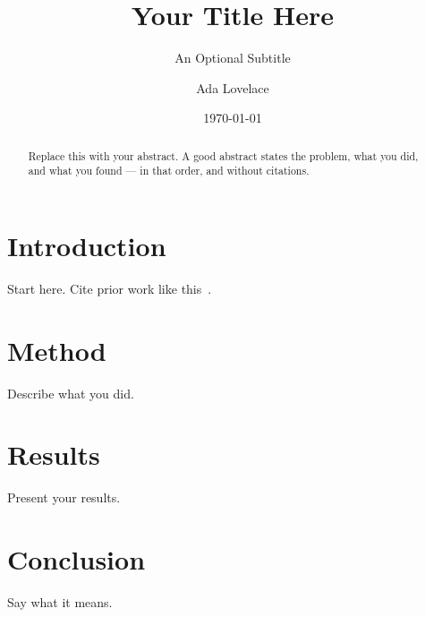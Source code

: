 \documentclass[a4paper,11pt]{paper}
\title{Your Title Here}
\subtitle{An Optional Subtitle}
\author{Ada Lovelace}
\date{\today}
\begin{document}
\maketitle

\begin{abstract}
Replace this with your abstract. A good abstract states the problem, what
you did, and what you found --- in that order, and without citations.
\end{abstract}

\section{Introduction}
Start here. Cite prior work like this~\cite{knuth1984texbook}.

\section{Method}
\label{sec:method}
Describe what you did.

\section{Results}
\label{sec:results}
Present your results.

\section{Conclusion}
Say what it means.



\end{document}
